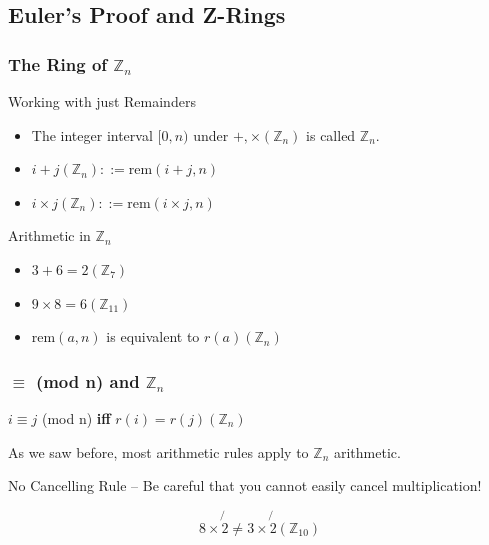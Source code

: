 \documentclass{beamer}
\begin{document}
\subsection{Euler's Proof and Z-Rings}
\begin{frame}
  \frametitle{The Ring of $\mathbb{Z}_n$}

  {\larger
    \begin{block}{Working with just Remainders}
      \begin{itemize}
      \item The integer interval $[0,n)$ under $+,\times
        (\mathbb{Z}_n)$ is called $\mathbb{Z}_n$.
        
        \bigskip
        
      \item $i+j (\mathbb{Z}_n) ::= \text{rem}(i+j,n)$
      \item $i\times j (\mathbb{Z}_n) ::= \text{rem}(i\times j,n)$
      \end{itemize}
    \end{block}

    \bigskip

    \begin{block}{Arithmetic in $\mathbb{Z}_n$}
      \begin{itemize}
      \item $3+6 = 2 (\mathbb{Z}_7)$
      \item $9\times8 = 6 (\mathbb{Z}_{11})$
      \item rem$(a,n)$ is equivalent to $r(a) (\mathbb{Z}_n)$
      \end{itemize}
    \end{block}
  }
\end{frame}

\begin{frame}
  \frametitle{$\equiv$ (mod n) and $\mathbb{Z}_n$}

  {\larger
    $i \equiv j$ (mod n) {\bf iff} $r(i) = r(j) (\mathbb{Z}_n)$

    \vfill

    As we saw before, most arithmetic rules apply to
    $\mathbb{Z}_n$ arithmetic.

    \bigskip

    \alert{No Cancelling Rule} -- Be careful that you cannot
    easily cancel multiplication!

    \begin{equation*}
      8\times \not{2} \neq 3\times\not{2} (\mathbb{Z}_{10})
    \end{equation*}
  }
\end{frame}
\end{document}
